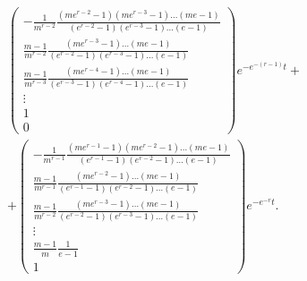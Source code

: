 \begin{multline}
\begin{pmatrix}
-\frac{1}{m^{r - 2}}\frac{\left(me^{r - 2} - 1\right)\left(me^{r -
3} -1\right)\ldots (me - 1)}{\left(e^{r - 2} -
1\right)\left(e^{r - 3} -1\right)\ldots (e - 1)}\\[2mm]
\frac{m - 1}{m^{r - 2}}\frac{\left(me^{r - 3} - 1\right) \ldots
(me - 1)}{\left(e^{r - 2} - 1\right)\left(e^{r - 3}
-1\right)\ldots (e - 1)}\\[2mm]
 \frac{m - 1}{m^{r -
3}}\frac{\left(me^{r - 4} - 1\right) \ldots (me - 1)}{\left(e^{r -
3} -
1\right)\left(e^{r - 4} -1\right)\ldots (e - 1)}\\[2mm]
\vdots\\1\\0\end{pmatrix} e^{-e^{-(r - 1)}t} +\\
+ \begin{pmatrix} 
-\frac{1}{m^{r - 1}}\frac{\left(me^{r - 1} -
1\right)\left(me^{r - 2} - 1\right)\ldots (me - 1)}{\left(e^{r -
1} - 1\right)\left(e^{r - 2} - 1\right)\ldots (e - 1)}\\[2mm]
\frac{m - 1}{m^{r - 1}}\frac{\left(me^{r - 2} - 1\right) \ldots
(me - 1)}{\left(e^{r - 1} -
1\right)\left(e^{r - 2} -1\right)\ldots (e - 1)}\\[2mm]
\frac{m - 1}{m^{r - 2}}\frac{\left(me^{r - 3} - 1\right) \ldots
(me - 1)}{\left(e^{r - 2} -
1\right)\left(e^{r - 3} -1\right)\ldots (e - 1)}\\[2mm]
\vdots\\[2mm] \frac{m - 1}{m}\frac{1}{e - 1}\\[2mm]
1\end{pmatrix}
e^{-e^{-r}t}. \label{sizova:formula}
\end{multline}

\smallskip


